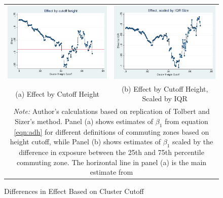 \begin{figure}\centering
\caption{Differences in Effect Based on Cluster Cutoff \label{fig:cutoff_dist}}
\begin{tabular}{cc}

\includegraphics[scale=.35]{./figures/cutoff_1990.png} & 
\includegraphics[scale=.35]{./figures/cutoff_iqr_1990.png}\\
(a) Effect by Cutoff Height & (b) Effect by Cutoff Height, Scaled by IQR \\
\multicolumn{2}{p{6.5in}}{\footnotesize \emph{Note:} Author's calculations based on replication of Tolbert and Sizer's method. Panel (a) shows estimates of $\beta_1$ from equation \ref{eqn:adh} for different definitions of commuting zones based on height cutoff, while Panel (b) shows estimates of $\beta_1$ scaled by the difference in exposure between the 25th and 75th percentile commuting zone. The horizontal line in panel (a) is the main estimate from \citet{ADH2013}}
\end{tabular}
\end{figure}

